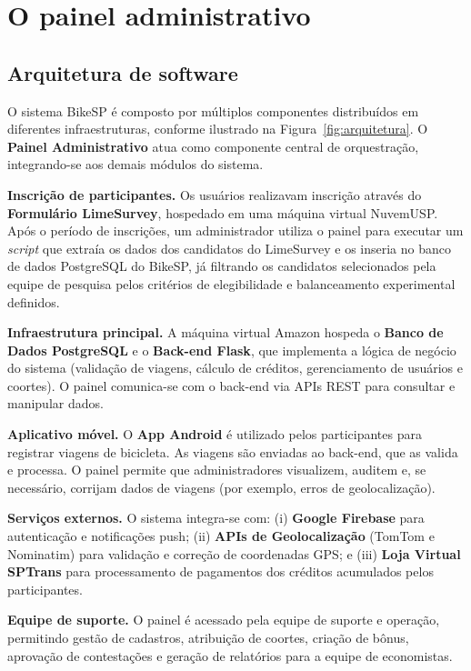
\chapter{O painel administrativo}
\label{cap:implementacao}

\section{Arquitetura de software}
O sistema BikeSP é composto por múltiplos componentes distribuídos em diferentes
infraestruturas, conforme ilustrado na Figura~\ref{fig:arquitetura}. O
\textbf{Painel Administrativo} atua como componente central de orquestração,
integrando-se aos demais módulos do sistema.

\textbf{Inscrição de participantes.} Os usuários realizavam inscrição através do
\textbf{Formulário LimeSurvey}, hospedado em uma máquina virtual NuvemUSP. Após
o período de inscrições, um administrador utiliza o painel para executar um
\emph{script} que extraía os dados dos candidatos do LimeSurvey e os inseria no
banco de dados PostgreSQL do BikeSP, já filtrando os candidatos selecionados pela 
equipe de pesquisa pelos critérios de elegibilidade e balanceamento experimental definidos.

\textbf{Infraestrutura principal.} A máquina virtual Amazon hospeda o
\textbf{Banco de Dados PostgreSQL} e o \textbf{Back-end Flask}, que implementa a
lógica de negócio do sistema (validação de viagens, cálculo de créditos,
gerenciamento de usuários e coortes). O painel comunica-se com o back-end via
APIs REST para consultar e manipular dados.

\textbf{Aplicativo móvel.} O \textbf{App Android} é utilizado pelos participantes
para registrar viagens de bicicleta. As viagens são enviadas ao back-end, que as
valida e processa. O painel permite que administradores visualizem, auditem e, se
necessário, corrijam dados de viagens (por exemplo, erros de geolocalização).

\textbf{Serviços externos.} O sistema integra-se com: (i) \textbf{Google
Firebase} para autenticação e notificações push; (ii) \textbf{APIs de
Geolocalização} (TomTom e Nominatim) para validação e correção de coordenadas
GPS; e (iii) \textbf{Loja Virtual SPTrans} para processamento de pagamentos dos
créditos acumulados pelos participantes.

\textbf{Equipe de suporte.} O painel é acessado pela equipe de suporte e
operação, permitindo gestão de cadastros, atribuição de coortes, criação de
bônus, aprovação de contestações e geração de relatórios para a equipe de
economistas.

